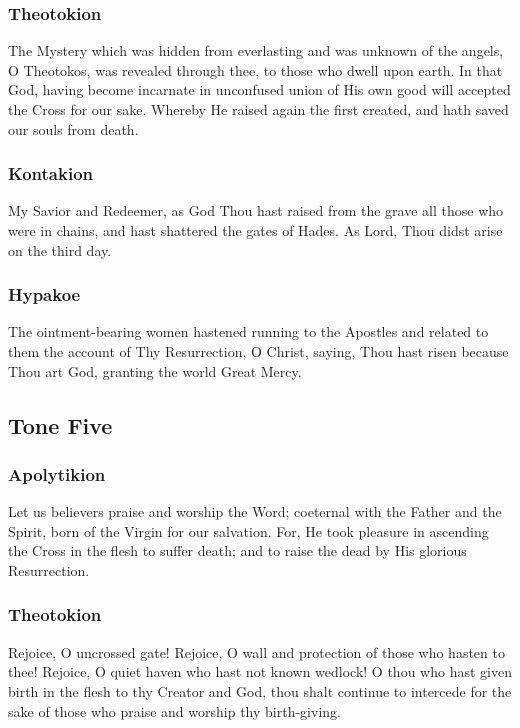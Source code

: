 \subsubsection{Theotokion}

The Mystery which was hidden from everlasting and was unknown of the angels, O Theotokos, was revealed through thee, to those who dwell upon earth. In that God, having become incarnate in unconfused union of His own good will accepted the Cross for our sake. Whereby He raised again the first created, and hath saved our souls from death.

\subsubsection{Kontakion}

My Savior and Redeemer, as God Thou hast raised from the grave all those who were in chains, and hast shattered the gates of Hades. As Lord, Thou didst arise on the third day.

\subsubsection{Hypakoe}

The ointment-bearing women hastened running to the Apostles and related to them the account of Thy Resurrection, O Christ, saying, Thou hast risen because Thou art God, granting the world Great Mercy.

\subsection{Tone Five}

\subsubsection{Apolytikion}

Let us believers praise and worship the Word; coeternal with the Father and the Spirit, born of the Virgin for our salvation. For, He took pleasure in ascending the Cross in the flesh to suffer death; and to raise the dead by His glorious Resurrection.

\subsubsection{Theotokion}

Rejoice, O uncrossed gate!  Rejoice, O wall and protection of those who hasten to thee!  Rejoice, O quiet haven who hast not known wedlock!  O thou who hast given birth in the flesh to thy Creator and God, thou shalt continue to intercede for the sake of those who praise and worship thy birth-giving.


